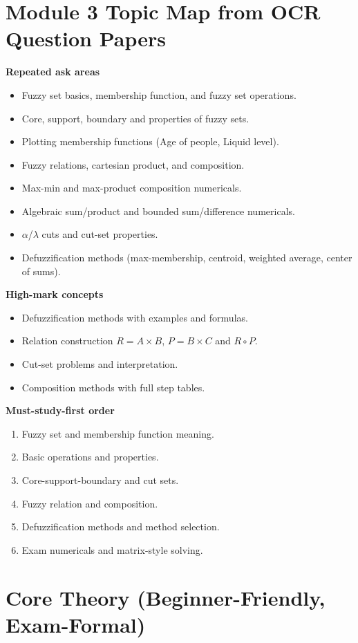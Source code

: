 \documentclass[11pt,a4paper]{article}
\begin{document}
\section*{Module 3 Topic Map from OCR Question Papers}
\textbf{Repeated ask areas}
\begin{itemize}
\item Fuzzy set basics, membership function, and fuzzy set operations.
\item Core, support, boundary and properties of fuzzy sets.
\item Plotting membership functions (Age of people, Liquid level).
\item Fuzzy relations, cartesian product, and composition.
\item Max-min and max-product composition numericals.
\item Algebraic sum/product and bounded sum/difference numericals.
\item $\alpha$/$\lambda$ cuts and cut-set properties.
\item Defuzzification methods (max-membership, centroid, weighted average, center of sums).
\end{itemize}

\textbf{High-mark concepts}
\begin{itemize}
\item Defuzzification methods with examples and formulas.
\item Relation construction $R=A\times B$, $P=B\times C$ and $R\circ P$.
\item Cut-set problems and interpretation.
\item Composition methods with full step tables.
\end{itemize}

\textbf{Must-study-first order}
\begin{enumerate}
\item Fuzzy set and membership function meaning.
\item Basic operations and properties.
\item Core-support-boundary and cut sets.
\item Fuzzy relation and composition.
\item Defuzzification methods and method selection.
\item Exam numericals and matrix-style solving.
\end{enumerate}

\section*{Core Theory (Beginner-Friendly, Exam-Formal)}
\end{document}
